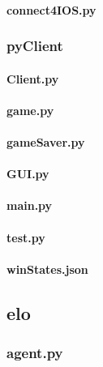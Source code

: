 \documentclass[12pt]{article}
\newcommand{\incFile}[2]{\label{code:#2}\newpage}
\begin{document}
\paragraph{connect4IOS.py}											\incFile{python}{Clients/iosClient/connect4IOS.py}
\subsubsection{pyClient}												%
\paragraph{Client.py}														\incFile{python}{Clients/pyClient/Client.py}
\paragraph{game.py}														\incFile{python}{Clients/pyClient/game.py}
\paragraph{gameSaver.py}												\incFile{python}{Clients/pyClient/gameSaver.py}
\paragraph{GUI.py}															\incFile{python}{Clients/pyClient/GUI.py}
\paragraph{main.py}														\incFile{python}{Clients/pyClient/main.py}
\paragraph{test.py}														\incFile{python}{Clients/pyClient/test.py}
\paragraph{winStates.json}											\incFile{python}{Clients/pyClient/winStates.json}

\subsection{elo}																%
\subsubsection{agent.py}												\incFile{python}{elo/agent.py}
\end{document}
